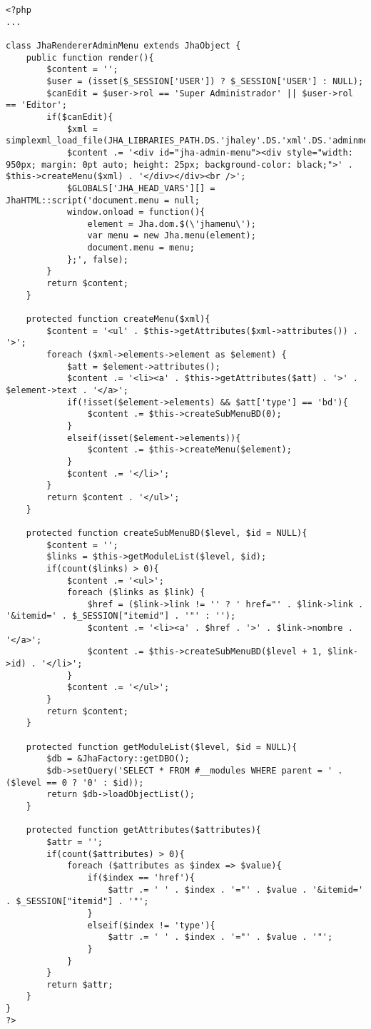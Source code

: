 \begin{lstlisting}[label=jha_renderer_admin_menu,caption=Renderizador para el men\'u de administraci\'on.]
<?php
...

class JhaRendererAdminMenu extends JhaObject {
    public function render(){
    	$content = '';
        $user = (isset($_SESSION['USER']) ? $_SESSION['USER'] : NULL);
        $canEdit = $user->rol == 'Super Administrador' || $user->rol == 'Editor';
        if($canEdit){
        	$xml = simplexml_load_file(JHA_LIBRARIES_PATH.DS.'jhaley'.DS.'xml'.DS.'adminmenu.xml');
        	$content .= '<div id="jha-admin-menu"><div style="width: 950px; margin: 0pt auto; height: 25px; background-color: black;">' . $this->createMenu($xml) . '</div></div><br />';
        	$GLOBALS['JHA_HEAD_VARS'][] = JhaHTML::script('document.menu = null;
        	window.onload = function(){
        	    element = Jha.dom.$(\'jhamenu\');
        	    var menu = new Jha.menu(element);
        	    document.menu = menu;
   	        };', false);
        }
        return $content;
    }
    
    protected function createMenu($xml){
    	$content = '<ul' . $this->getAttributes($xml->attributes()) . '>';
   		foreach ($xml->elements->element as $element) {
   			$att = $element->attributes();
   			$content .= '<li><a' . $this->getAttributes($att) . '>' . $element->text . '</a>';
   			if(!isset($element->elements) && $att['type'] == 'bd'){
			    $content .= $this->createSubMenuBD(0);
   			}
   			elseif(isset($element->elements)){
   				$content .= $this->createMenu($element);
   			}
   			$content .= '</li>';
   		}
    	return $content . '</ul>';
    }
    
    protected function createSubMenuBD($level, $id = NULL){
    	$content = '';
    	$links = $this->getModuleList($level, $id);
    	if(count($links) > 0){
    		$content .= '<ul>';
	    	foreach ($links as $link) {
	    		$href = ($link->link != '' ? ' href="' . $link->link . '&itemid=' . $_SESSION["itemid"] . '"' : '');
	    		$content .= '<li><a' . $href . '>' . $link->nombre . '</a>';
	    		$content .= $this->createSubMenuBD($level + 1, $link->id) . '</li>';
	    	}
	    	$content .= '</ul>';
    	}
    	return $content;
    }
    
    protected function getModuleList($level, $id = NULL){
    	$db = &JhaFactory::getDBO();
    	$db->setQuery('SELECT * FROM #__modules WHERE parent = ' . ($level == 0 ? '0' : $id));
        return $db->loadObjectList();
    }
    
    protected function getAttributes($attributes){
    	$attr = '';
    	if(count($attributes) > 0){
    		foreach ($attributes as $index => $value){
    			if($index == 'href'){
    				$attr .= ' ' . $index . '="' . $value . '&itemid=' . $_SESSION["itemid"] . '"';
    			}
    			elseif($index != 'type'){
    			    $attr .= ' ' . $index . '="' . $value . '"';
    			}
    		}
    	}
    	return $attr;
    }
}
?>
\end{lstlisting}
